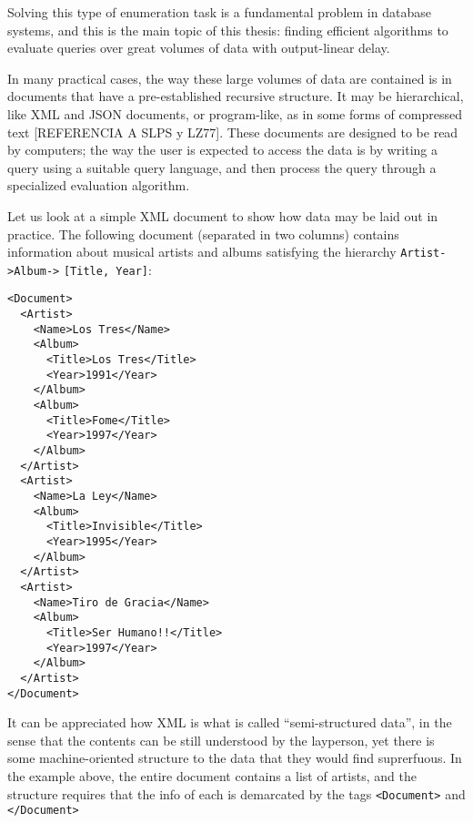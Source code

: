 Solving this type of enumeration task is a fundamental problem in database systems, and this is the main topic of this thesis: finding efficient algorithms to evaluate queries over great volumes of data with output-linear delay.

In many practical cases, the way these large volumes of data are contained is in documents that have a pre-established recursive structure. It may be hierarchical, like XML and JSON documents, or program-like, as in some forms of compressed text [REFERENCIA A SLPS y LZ77]. These documents are designed to be read by computers; the way the user is expected to access the data is by writing a query using a suitable query language, and then process the query through a specialized evaluation algorithm.


Let us look at a simple XML document to show how data may be laid out in practice. The following document (separated in two columns) contains information about musical artists and albums satisfying the hierarchy {\tt Artist->Album->} {\tt [Title, Year]}:
	
\begin{multicols}{2}
	\begin{small}
	\begin{verbatim}
<Document>
  <Artist>
    <Name>Los Tres</Name>
    <Album>
      <Title>Los Tres</Title>
      <Year>1991</Year>
    </Album>
    <Album>
      <Title>Fome</Title>
      <Year>1997</Year>
    </Album>
  </Artist>
  <Artist>
    <Name>La Ley</Name>
    <Album>
      <Title>Invisible</Title>
      <Year>1995</Year>
    </Album>
  </Artist>
  <Artist>
    <Name>Tiro de Gracia</Name>
    <Album>
      <Title>Ser Humano!!</Title>
      <Year>1997</Year>
    </Album>
  </Artist>
</Document>
	\end{verbatim}
	\end{small}
\end{multicols}

It can be appreciated how XML is what is called ``semi-structured data'', in the sense that the contents can be still understood by the layperson, yet there is some machine-oriented structure to the data that they would find suprerfuous. In the example above, the entire document contains a list of artists, and the structure requires that the info of each is demarcated by the tags {\tt <Document>} and {\tt </Document>}


